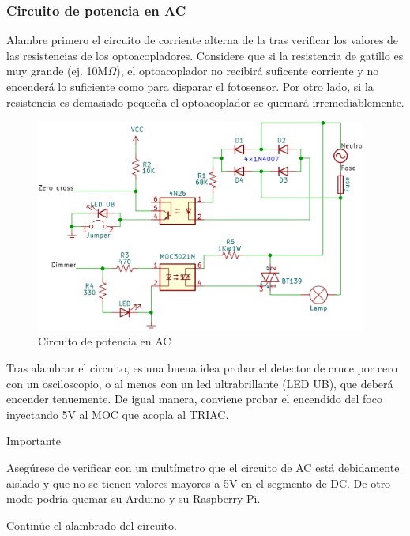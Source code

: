 \subsubsection{Circuito de potencia en AC}%
Alambre primero el circuito de corriente alterna de la  tras verificar los valores de las resistencias de los optoacopladores.
Considere que si la resistencia de gatillo es muy grande (ej. 10M$\Omega$), el optoacoplador no recibirá suficente corriente y no encenderá lo suficiente como para disparar el fotosensor.
Por otro lado, si la resistencia es demasiado pequeña el optoacoplador se quemará irremediablemente.

\begin{figure}[H]
	\centering
	\includegraphics[width=0.5\columnwidth,height=7cm,keepaspectratio]{img/circuit-ac.png}
	\caption{Circuito de potencia en AC}%
	\label{fig:circuit-ac}
\end{figure}

Tras alambrar el circuito, es una buena idea probar el detector de cruce por cero con un osciloscopio, o al menos con un led ultrabrillante (LED UB), que deberá encender tenuemente.
De igual manera, conviene probar el encendido del foco inyectando 5V al MOC que acopla al TRIAC.

\medskip
\begin{importantbox}{\large Importante}
	\begin{center}
		Asegúrese de verificar con un multímetro que el circuito de AC está debidamente aislado y que no se tienen valores mayores a 5V en el segmento de DC.
		De otro modo podría quemar su Arduino y su Raspberry Pi.
	\end{center}
\end{importantbox}

Continúe el alambrado del circuito.

